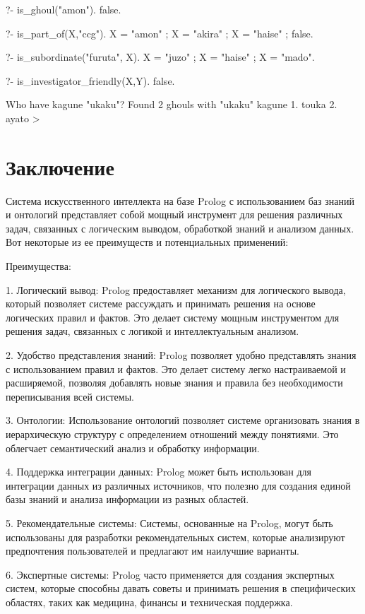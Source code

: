 ?- is_ghoul("amon").
false.

?- is_part_of(X,"ccg").
X = "amon" ;
X = "akira" ;
X = "haise" ;
false.

?- is_subordinate("furuta", X).
X = "juzo" ;
X = "haise" ;
X = "mado".

?- is_investigator_friendly(X,Y).
false.


Who have kagune "ukaku"?
Found 2 ghouls with "ukaku" kagune
1. touka
2. ayato
>

\section{Заключение}
    Система искусственного интеллекта на базе Prolog с использованием баз знаний и онтологий представляет собой мощный инструмент для решения различных задач, связанных с логическим выводом, обработкой знаний и анализом данных. Вот некоторые из ее преимуществ и потенциальных применений:

Преимущества:

1. Логический вывод: Prolog предоставляет механизм для логического вывода, который позволяет системе рассуждать и принимать решения на основе логических правил и фактов. Это делает систему мощным инструментом для решения задач, связанных с логикой и интеллектуальным анализом.

2. Удобство представления знаний: Prolog позволяет удобно представлять знания с использованием правил и фактов. Это делает систему легко настраиваемой и расширяемой, позволяя добавлять новые знания и правила без необходимости переписывания всей системы.

3. Онтологии: Использование онтологий позволяет системе организовать знания в иерархическую структуру с определением отношений между понятиями. Это облегчает семантический анализ и обработку информации.

4. Поддержка интеграции данных: Prolog может быть использован для интеграции данных из различных источников, что полезно для создания единой базы знаний и анализа информации из разных областей.

5. Рекомендательные системы: Системы, основанные на Prolog, могут быть использованы для разработки рекомендательных систем, которые анализируют предпочтения пользователей и предлагают им наилучшие варианты.

6. Экспертные системы: Prolog часто применяется для создания экспертных систем, которые способны давать советы и принимать решения в специфических областях, таких как медицина, финансы и техническая поддержка.

